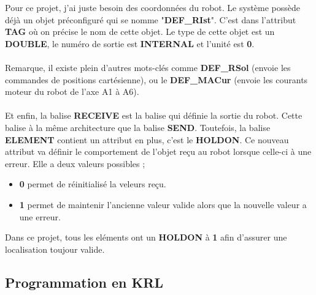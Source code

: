 Pour ce projet, j'ai juste besoin des coordonnées du robot.
Le système possède déjà un objet préconfiguré qui se nomme "\textbf{DEF\_RIst}".
C'est dans l'attribut \textbf{TAG} où on précise le nom de cette objet.
Le type de cette objet est un \textbf{DOUBLE}, le numéro de sortie est \textbf{INTERNAL} et l'unité est \textbf{0}.
\\
\\
Remarque, il existe plein d'autres mots-clés comme \textbf{DEF\_RSol} (envoie les commandes de positions cartésienne), ou le \textbf{DEF\_MACur} (envoie les courants moteur du robot de l'axe A1 à A6).
\\
\\
Et enfin, la balise \textbf{RECEIVE} est la balise qui définie la sortie du robot.
Cette balise à la même architecture que la balise \textbf{SEND}.
Toutefois, la balise \textbf{ELEMENT} contient un attribut en plus, c'est le \textbf{HOLDON}.
Ce nouveau attribut va définir le comportement de l'objet reçu au robot lorsque celle-ci à une erreur.
Elle a deux valeurs possibles ;
\begin{itemize}
    \item \textbf{0} permet de réinitialisé la veleurs reçu.
    \item \textbf{1} permet de maintenir l'ancienne valeur valide alors que la nouvelle valeur a une erreur.
\end{itemize}
Dans ce projet, tous les eléments ont un \textbf{HOLDON} à \textbf{1} afin d'assurer une localisation toujour valide.

\subsection{Programmation en KRL}

